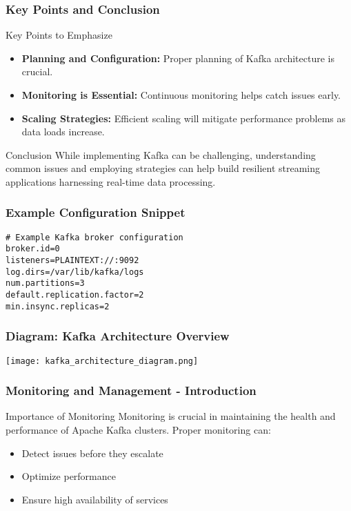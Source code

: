 \documentclass[aspectratio=169]{beamer}
\begin{document}
\begin{frame}[fragile]
    \frametitle{Key Points and Conclusion}
    \begin{block}{Key Points to Emphasize}
        \begin{itemize}
            \item \textbf{Planning and Configuration:} Proper planning of Kafka architecture is crucial.
            \item \textbf{Monitoring is Essential:} Continuous monitoring helps catch issues early.
            \item \textbf{Scaling Strategies:} Efficient scaling will mitigate performance problems as data loads increase.
        \end{itemize}
    \end{block}

    \begin{block}{Conclusion}
        While implementing Kafka can be challenging, understanding common issues and employing strategies can help build resilient streaming applications harnessing real-time data processing.
    \end{block}
\end{frame}

\begin{frame}[fragile]
    \frametitle{Example Configuration Snippet}
    \begin{lstlisting}[language=properties]
# Example Kafka broker configuration
broker.id=0
listeners=PLAINTEXT://:9092
log.dirs=/var/lib/kafka/logs
num.partitions=3
default.replication.factor=2
min.insync.replicas=2
    \end{lstlisting}
\end{frame}

\begin{frame}[fragile]
    \frametitle{Diagram: Kafka Architecture Overview}
    \texttt{[image: kafka\_architecture\_diagram.png]} %
\end{frame}

\begin{frame}[fragile]
  \frametitle{Monitoring and Management - Introduction}
  \begin{block}{Importance of Monitoring}
    Monitoring is crucial in maintaining the health and performance of Apache Kafka clusters. Proper monitoring can:
    \begin{itemize}
      \item Detect issues before they escalate
      \item Optimize performance
      \item Ensure high availability of services
    \end{itemize}
  \end{block}
\end{frame}
\end{document}
